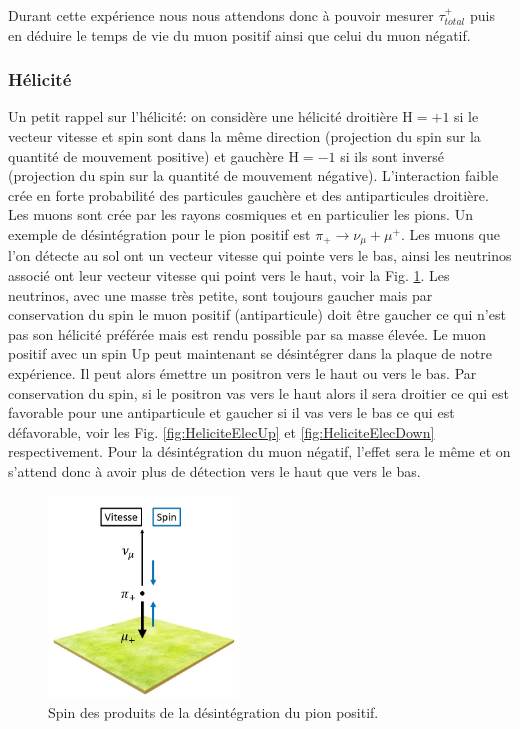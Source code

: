 \documentclass[12pt]{article}
\begin{document}
Durant cette expérience nous nous attendons donc à pouvoir mesurer $\tau_{total}^{+}$  puis en déduire le temps de vie du muon positif ainsi que celui du muon négatif.

\newpage

\subsubsection{Hélicité}

Un petit rappel sur l'hélicité: on considère une hélicité droitière H$=+1$ si le vecteur vitesse et spin sont dans la même direction (projection du spin sur la quantité de mouvement positive) et gauchère H$=-1$ si ils sont inversé (projection du spin sur la quantité de mouvement négative). L'interaction faible crée en forte probabilité des particules gauchère et des antiparticules droitière. Les muons sont crée par les rayons cosmiques et en particulier les pions. Un exemple de désintégration pour le pion positif est $\pi_{+}\rightarrow\nu_{\mu}+\mu^{+}$. Les muons que l'on détecte au sol ont un vecteur vitesse qui pointe vers le bas, ainsi les neutrinos associé ont leur vecteur vitesse qui point vers le haut, voir la Fig. \ref{fig:Helicite}. Les neutrinos, avec une masse très petite, sont toujours gaucher mais par conservation du spin le muon positif (antiparticule) doit être gaucher ce qui n'est pas son hélicité préférée mais est rendu possible par sa masse élevée. Le muon positif avec un spin Up peut maintenant se désintégrer dans la plaque de notre expérience. Il peut alors émettre un positron vers le haut ou vers le bas. Par conservation du spin, si le positron vas vers le haut alors il sera droitier ce qui est favorable pour une antiparticule et gaucher si il vas vers le bas ce qui est défavorable, voir les Fig. \ref{fig:HeliciteElecUp} et \ref{fig:HeliciteElecDown} respectivement. Pour la désintégration du muon négatif, l'effet sera le même et on s'attend donc à avoir plus de détection vers le haut que vers le bas.

\begin{figure}[htpb!]
    \centering
    \includegraphics[width=0.45\textwidth]{Images/Photos/Helicite.jpg}
    \caption{Spin des produits de la désintégration du pion positif.}
    \label{fig:Helicite}
\end{figure}
\end{document}
